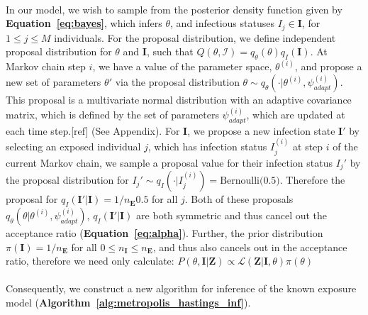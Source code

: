 \documentclass{article}
\begin{document}
\paragraph{}In our model, we wish to sample from the posterior density function given by \textbf{Equation~\ref{eq:bayes}}, which infers $\theta$, and infectious statuses ${I_j} \in \mathbf{I}$, for $1 \leq j \leq M$ individuals. For the proposal distribution, we define independent proposal distribution for $\theta$ and $\mathbf{I}$,  such that $Q(\theta, \mathcal{I}) = q_\theta(\theta)q_I(\mathbf{I})$. At Markov chain step $i$, we have a value of the parameter space, $\theta^{(i)}$, and propose a new set of parameters $\theta'$ via the proposal distribution $\theta \sim q_\theta(\cdot | \theta^{(i)}, \psi^{(i)}_{adapt})$. This proposal is a multivariate normal distribution with an adaptive covariance matrix, which is defined by the set of parameters $\psi^{(i)}_{adapt}$, which are updated at each time step.[ref] (See Appendix). For $\mathbf{I}$, we propose a new infection state $\mathbf{I}'$ by selecting an exposed individual $j$, which has infection status $I_j^{(i)}$ at step $i$ of the current Markov chain, we sample a proposal value for their infection status $I_j'$ by the proposal distribution for $I_j' \sim q_I(\cdot | I^{(i)}_j)= \text{Bernoulli(0.5)}$. Therefore the proposal for $q_I(\mathbf{I}'|\mathbf{I}) = 1/n_\mathbf{E}0.5$ for all $j$. Both of these proposals $q_\theta\left(\theta | \theta^{(i)}, \psi^{(i)}_{adapt}\right)$, $q_I(\mathbf{I}'|\mathbf{I})$ are both symmetric and thus cancel out the acceptance ratio (\textbf{Equation~\ref{eq:alpha}}). Further, the prior distribution $\pi(\mathbf{I}) = 1 / n_\mathbf{E}$ for all $0 \leq n_\mathbf{I} \leq n_\mathbf{E}$, and thus also cancels out in the acceptance ratio, therefore we need only calculate: $P(\theta, \mathbf{I} | \mathbf{Z}) \propto \mathcal{L}(\mathbf{Z} | \mathbf{I}, \theta)\pi(\theta)$

\paragraph{}Consequently, we construct a new algorithm for inference of the known exposure model (\textbf{Algorithm~\ref{alg:metropolis_hastings_inf}}).
\end{document}
